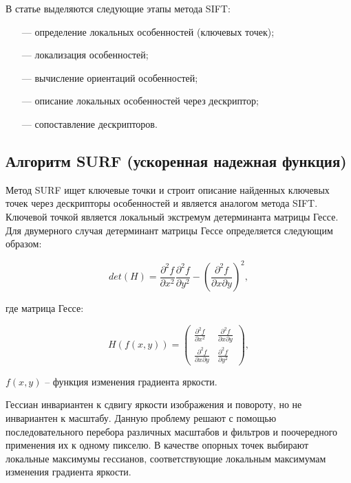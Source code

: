 В статье \cite{siftsurf} выделяются следующие этапы метода SIFT:
\begin{itemize}
	\item[---] определение локальных особенностей (ключевых точек);
	\item[---] локализация особенностей;
	\item[---] вычисление ориентаций особенностей;
	\item[---] описание локальных особенностей через дескриптор;
	\item[---] сопоставление дескрипторов. 	
\end{itemize}



\subsection{Алгоритм SURF (ускоренная надежная функция)}
Метод SURF ищет ключевые точки и строит описание найденных ключевых точек через дескрипторы особенностей и является аналогом метода SIFT. Ключевой точкой является локальный экстремум детерминанта матрицы Гессе. Для двумерного случая
детерминант матрицы Гессе определяется следующим образом:

\begin{equation}
	det(H) =  \frac{\partial^2f}{\partial x^2} \frac{\partial^2f}{\partial y^2} 
	-  (\frac{\partial^2f}{\partial x \partial y})^2,
\end{equation}

где \newline
\hspace*{30mm} матрица Гессе:             

\begin{equation}
	H(f(x,y)) = \begin{pmatrix}
		\frac{\partial^2f}{\partial x^2} & \frac{\partial^2f}{\partial x \partial y} \\
		\frac{\partial^2f}{\partial x \partial y} & \frac{\partial^2f}{\partial y^2}
	\end{pmatrix},	
\end{equation} 
\begin{center}
	$f(x,y)$ -- функция изменения градиента яркости.    
\end{center}


Гессиан инвариантен к сдвигу яркости изображения и повороту, но не инвариантен к масштабу. Данную проблему решают с помощью последовательного
перебора различных масштабов и фильтров и поочередного применения их к
одному пикселю. В качестве опорных точек выбирают локальные максимумы
гессианов, соответствующие локальным максимумам изменения градиента яркости. 

